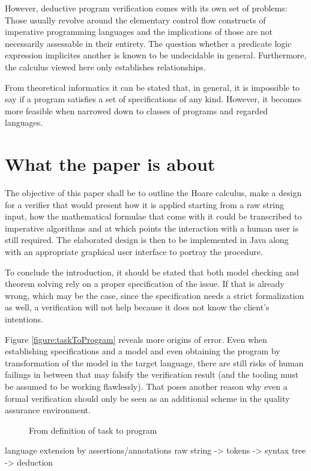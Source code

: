 However, deductive program verification comes with its own set of problems: Those usually revolve around the elementary control flow constructs of imperative programming languages and the implications of those are not necessarily assessable in their entirety. The question whether a predicate logic expression implicites another is known to be undecidable in general. Furthermore, the calculus viewed here only establishes relationships.

From theoretical informatics it can be stated that, in general, it is impossible to say if a program satisfies a set of specifications of any kind. However, it becomes more feasible when narrowed down to classes of programs and regarded languages.

\section{What the paper is about}
The objective of this paper shall be to outline the Hoare calculus, make a design for a verifier that would present how it is applied starting from a raw string input, how the mathematical formulae that come with it could be transcribed to imperative algorithms and at which points the interaction with a human user is still required. The elaborated design is then to be implemented in Java along with an appropriate graphical user interface to portray the procedure.

To conclude the introduction, it should be stated that both model checking and theorem solving rely on a proper specification of the issue. If that is already wrong, which may be the case, since the specification needs a strict formalization as well, a verification will not help because it does not know the client's intentions.

Figure \ref{figure:taskToProgram} reveals more origins of error. Even when establishing specifications and a model and even obtaining the program by transformation of the model in the target language, there are still risks of human failings in between that may falsify the verification result (and the tooling must be assumed to be working flawlessly). That poses another reason why even a formal verification should only be seen as an additional scheme in the quality assurance environment.

\begin{figure}
	\label{taskToProgram}
	\caption{From definition of task to program}
\end{figure}

language extension by assertions/annotations
raw string -> tokens -> syntax tree -> deduction

